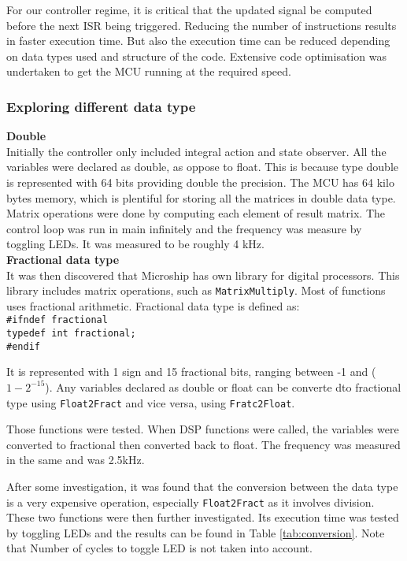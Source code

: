 For our controller regime, it is critical that the updated signal be computed before the next ISR being triggered. Reducing the number of instructions results in faster execution time. But also the execution time can be reduced depending on data types used and structure of the code. Extensive code optimisation was undertaken to get the MCU running at the required speed. 

\subsubsection{Exploring different data type}
\textbf{Double}\\
Initially the controller only included integral action and state observer. All the variables were declared as double, as oppose to float. This is because type double is represented with 64 bits providing double the precision. The MCU has 64 kilo bytes memory, which is plentiful for storing all the matrices in double data type. 
Matrix operations were done by computing each element of result matrix. The control loop was run in main infinitely and the frequency was measure by toggling LEDs. It was measured to be roughly 4 kHz. \\

\textbf{Fractional data type}\\
It was then discovered that Microship has own library for digital processors. This library includes matrix operations, such as \texttt{MatrixMultiply}. Most of functions uses fractional arithmetic. Fractional data type is defined as:\\
\texttt{\#ifndef fractional}\\
    \texttt{typedef int fractional;}\\
\texttt{\#endif}

It is represented with 1 sign and 15 fractional bits, ranging between -1 and ($1-2^{-15}$). Any variables declared as double or float can be converte dto fractional type using \texttt{Float2Fract} and vice versa, using \texttt{Fratc2Float}. 

Those functions were tested. When DSP functions were called, the variables were converted to fractional then converted back to float. The frequency was measured in the same and was 2.5kHz. 

After some investigation, it was found that the conversion between the data type is a very expensive operation, especially \texttt{Float2Fract} as it involves division. These two functions were then further investigated. Its execution time was tested by toggling LEDs and the results can be found in Table \ref{tab:conversion}. Note that Number of cycles to toggle LED is not taken into account. 

